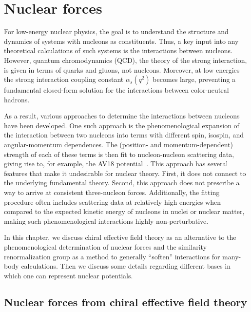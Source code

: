 \chapter{Nuclear forces}\label{ch:nuclear_forces}

For low-energy nuclear physics,
the goal is to understand the structure and dynamics of systems
with nucleons as constituents.
Thus, a key input into any theoretical calculations of such systems
is the interactions between nucleons.
However, quantum chromodynamics (QCD),
the theory of the strong interaction,
is given in terms of quarks and gluons, not nucleons.
Moreover, at low energies the strong interaction coupling constant $\alpha_s(q^2)$ becomes large,
preventing a fundamental closed-form solution for the interactions between color-neutral hadrons.

As a result, various approaches to determine the interactions between nucleons
have been developed.
One such approach is the phenomenological expansion of the interaction between two nucleons
into terms with different spin, isospin, and angular-momentum dependences.
The (position- and momentum-dependent) strength of each of these terms is then fit to nucleon-nucleon scattering data,
giving rise to, for example, the AV18 potential~\cite{Wiri95AV18}.
This approach has several features that make it undesirable for \abinitio{} nuclear theory.
First, it does not connect to the underlying fundamental theory.
Second, this approach does not prescribe a way to arrive at consistent three-nucleon forces.
Additionally, the fitting procedure often includes scattering data at relatively high energies
when compared to the expected kinetic energy of nucleons in nuclei or nuclear matter,
making such phenomenological interactions highly non-perturbative.

In this chapter, we discuss chiral effective field theory
as an alternative to the phenomenological determination of nuclear forces
and the similarity renormalization group as a method to generally ``soften'' interactions
for many-body calculations.
Then we discuss some details regarding different bases
in which one can represent nuclear potentials.

\section{Nuclear forces from chiral effective field theory}

